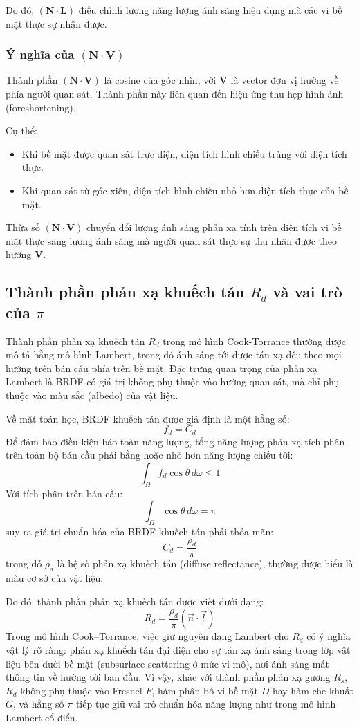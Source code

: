 Do đó, $(\mathbf{N} \cdot \mathbf{L})$ điều chỉnh lượng năng lượng ánh sáng hiệu dụng mà các vi bề mặt thực sự nhận được.

\subsubsection{Ý nghĩa của $(\mathbf{N} \cdot \mathbf{V})$}

Thành phần $(\mathbf{N} \cdot \mathbf{V})$ là cosine của góc nhìn, với $\mathbf{V}$ là vector đơn vị hướng về phía người quan sát. Thành phần này liên quan đến hiệu ứng thu hẹp hình ảnh (foreshortening).

Cụ thể:
\begin{itemize}
	\item Khi bề mặt được quan sát trực diện, diện tích hình chiếu trùng với diện tích thực.
	\item Khi quan sát từ góc xiên, diện tích hình chiếu nhỏ hơn diện tích thực của bề mặt.
\end{itemize}

Thừa số $(\mathbf{N} \cdot \mathbf{V})$ chuyển đổi lượng ánh sáng phản xạ tính trên diện tích vi bề mặt thực sang lượng ánh sáng mà người quan sát thực sự thu nhận được theo hướng $\mathbf{V}$.

\subsection{Thành phần phản xạ khuếch tán $R_d$ và vai trò của $\pi$}

Thành phần phản xạ khuếch tán $R_d$ trong mô hình Cook-Torrance thường được mô tả bằng mô hình Lambert, trong đó ánh sáng tới được tán xạ đều theo mọi hướng trên bán cầu phía trên bề mặt. Đặc trưng quan trọng của phản xạ Lambert là BRDF có giá trị không phụ thuộc vào hướng quan sát, mà chỉ phụ thuộc vào màu sắc (albedo) của vật liệu.

Về mặt toán học, BRDF khuếch tán được giả định là một hằng số:
\[
f_d = C_d
\]
Để đảm bảo điều kiện bảo toàn năng lượng, tổng năng lượng phản xạ tích phân trên toàn bộ bán cầu phải bằng hoặc nhỏ hơn năng lượng chiếu tới:
\[
\int_{\Omega} f_d \cos\theta \, d\omega \le 1
\]
Với tích phân trên bán cầu:
\[
\int_{\Omega} \cos\theta \, d\omega = \pi
\]
suy ra giá trị chuẩn hóa của BRDF khuếch tán phải thỏa mãn:
\[
C_d = \frac{\rho_d}{\pi}
\]
trong đó \(\rho_d\) là hệ số phản xạ khuếch tán (diffuse reflectance), thường được hiểu là màu cơ sở của vật liệu.

Do đó, thành phần phản xạ khuếch tán được viết dưới dạng:
\[
R_d = \frac{\rho_d}{\pi} (\vec{n} \cdot \vec{l})
\]
Trong mô hình Cook--Torrance, việc giữ nguyên dạng Lambert cho $R_d$ có ý nghĩa vật lý rõ ràng: phản xạ khuếch tán đại diện cho sự tán xạ ánh sáng trong lớp vật liệu bên dưới bề mặt (subsurface scattering ở mức vi mô), nơi ánh sáng mất thông tin về hướng tới ban đầu. Vì vậy, khác với thành phần phản xạ gương $R_s$, $R_d$ không phụ thuộc vào Fresnel $F$, hàm phân bố vi bề mặt $D$ hay hàm che khuất $G$, và hằng số $\pi$ tiếp tục giữ vai trò chuẩn hóa năng lượng như trong mô hình Lambert cổ điển.

